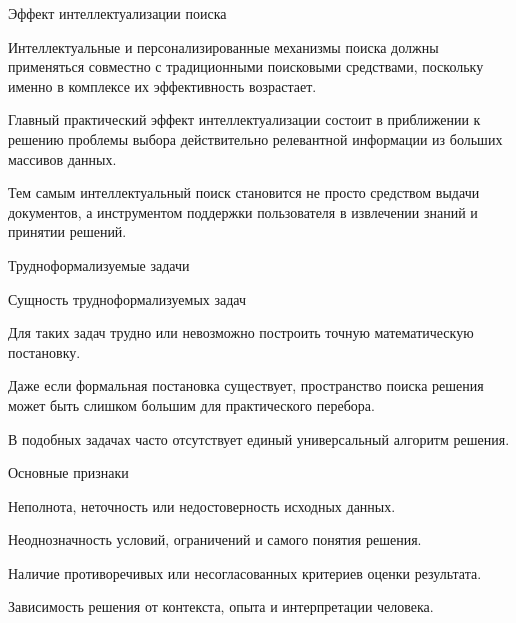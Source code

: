 \begin{frame}{Эффект интеллектуализации поиска}
	\topline
	\justifying
	
	\begin{textitemize}
		\item Интеллектуальные и персонализированные механизмы поиска должны применяться совместно с традиционными поисковыми средствами, поскольку именно в комплексе их эффективность возрастает.
		\item Главный практический эффект интеллектуализации состоит в приближении к решению проблемы выбора действительно релевантной информации из больших массивов данных.
		\item Тем самым интеллектуальный поиск становится не просто средством выдачи документов, а инструментом поддержки пользователя в извлечении знаний и принятии решений.
	\end{textitemize}
\end{frame}

\begin{frame}{Трудноформализуемые задачи}
	\topline
	\justifying
	
	\begin{SCn}
	\end{SCn}
\end{frame}

\begin{frame}{Сущность трудноформализуемых задач}
	\topline
	\justifying
	
	\begin{textitemize}
		\item Для таких задач трудно или невозможно построить точную математическую постановку.
		\item Даже если формальная постановка существует, пространство поиска решения может быть слишком большим для практического перебора.
		\item В подобных задачах часто отсутствует единый универсальный алгоритм решения.
	\end{textitemize}
\end{frame}

\begin{frame}{Основные признаки}
	\topline
	\justifying
	
	\begin{textitemize}
		\item Неполнота, неточность или недостоверность исходных данных.
		\item Неоднозначность условий, ограничений и самого понятия решения.
		\item Наличие противоречивых или несогласованных критериев оценки результата.
		\item Зависимость решения от контекста, опыта и интерпретации человека.
	\end{textitemize}
\end{frame}


